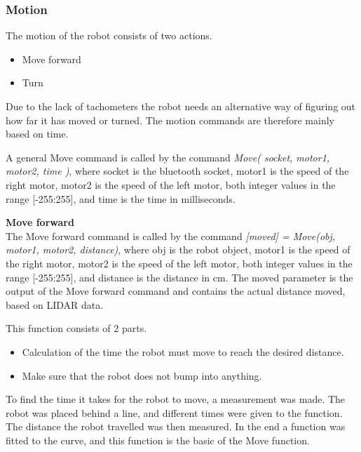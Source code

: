 \subsubsection{Motion}
The motion of the robot consists of two actions.
\begin{itemize}
\item Move forward 
\item Turn
\end{itemize}
Due to the lack of tachometers the robot needs an alternative way of figuring out how far it has moved or turned. The motion commands are therefore mainly based on time.

A general Move command is called by the command \textit{Move( socket, motor1, motor2, time )}, where socket is the bluetooth socket, motor1 is the speed of the right motor, motor2 is the speed of the left motor, both integer values in the range [-255:255], and time is the time in milliseconds.

\textbf{Move forward}\\
The Move forward command is called by the command \textit{[moved] = Move(obj, motor1, motor2, distance)}, where obj is the robot object, motor1 is the speed of the right motor, motor2 is the speed of the left motor, both integer values in the range [-255:255], and distance is the distance in cm. The moved parameter is the output of the Move forward command and contains the actual distance moved, based on LIDAR data.

This function consists of 2 parts. 
\begin{itemize}
\item Calculation of the time the robot must move to reach the desired distance.
\item Make sure that the robot does not bump into anything.
\end{itemize}
To find the time it takes for the robot to move, a measurement was made. The robot was placed behind a line, and different times were given to the function. The distance the robot travelled was then measured. In the end a function was fitted to the curve, and this function is the basic of the Move function.

